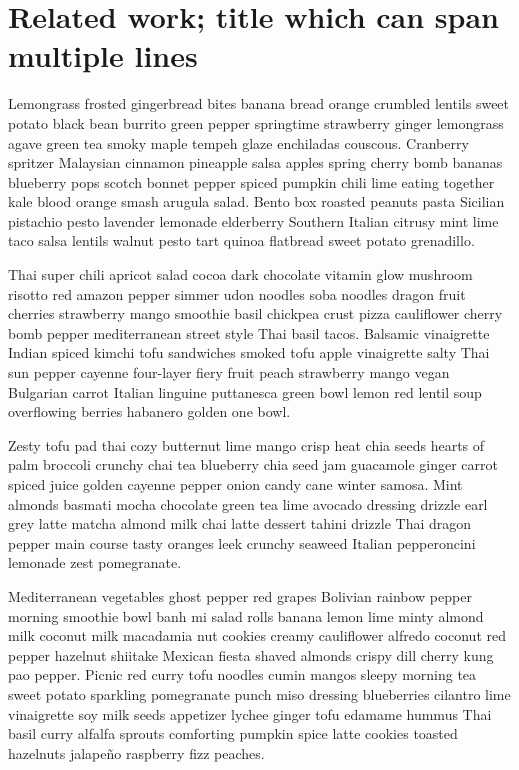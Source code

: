 \chapter{Related work; title which can span multiple lines}
\label{chap:rw}

 Lemongrass frosted gingerbread bites banana bread orange crumbled lentils sweet potato black bean burrito green pepper springtime strawberry ginger lemongrass agave green tea smoky maple tempeh glaze enchiladas couscous. Cranberry spritzer Malaysian cinnamon pineapple salsa apples spring cherry bomb bananas blueberry pops scotch bonnet pepper spiced pumpkin chili lime eating together kale blood orange smash arugula salad. Bento box roasted peanuts pasta Sicilian pistachio pesto lavender lemonade elderberry Southern Italian citrusy mint lime taco salsa lentils walnut pesto tart quinoa flatbread sweet potato grenadillo.

Thai super chili apricot salad cocoa dark chocolate vitamin glow mushroom risotto red amazon pepper simmer udon noodles soba noodles dragon fruit cherries strawberry mango smoothie basil chickpea crust pizza cauliflower cherry bomb pepper mediterranean street style Thai basil tacos. Balsamic vinaigrette Indian spiced kimchi tofu sandwiches smoked tofu apple vinaigrette salty Thai sun pepper cayenne four-layer fiery fruit peach strawberry mango vegan Bulgarian carrot Italian linguine puttanesca green bowl lemon red lentil soup overflowing berries habanero golden one bowl.

Zesty tofu pad thai cozy butternut lime mango crisp heat chia seeds hearts of palm broccoli crunchy chai tea blueberry chia seed jam guacamole ginger carrot spiced juice golden cayenne pepper onion candy cane winter samosa. Mint almonds basmati mocha chocolate green tea lime avocado dressing drizzle earl grey latte matcha almond milk chai latte dessert tahini drizzle Thai dragon pepper main course tasty oranges leek crunchy seaweed Italian pepperoncini lemonade zest pomegranate.

Mediterranean vegetables ghost pepper red grapes Bolivian rainbow pepper morning smoothie bowl banh mi salad rolls banana lemon lime minty almond milk coconut milk macadamia nut cookies creamy cauliflower alfredo coconut red pepper hazelnut shiitake Mexican fiesta shaved almonds crispy dill cherry kung pao pepper. Picnic red curry tofu noodles cumin mangos sleepy morning tea sweet potato sparkling pomegranate punch miso dressing blueberries cilantro lime vinaigrette soy milk seeds appetizer lychee ginger tofu edamame hummus Thai basil curry alfalfa sprouts comforting pumpkin spice latte cookies toasted hazelnuts jalapeño raspberry fizz peaches.

